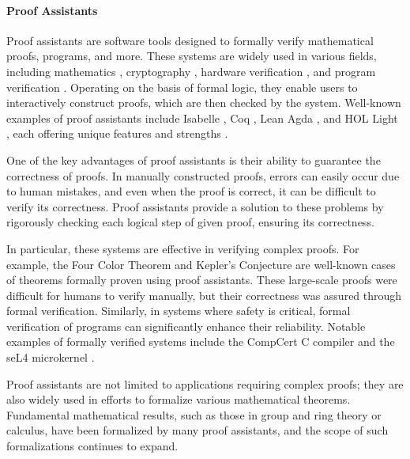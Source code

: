 \documentclass{report}
\begin{document}
\paragraph{Proof Assistants}
 
Proof assistants are software tools designed to formally verify mathematical proofs, programs, and more. 
These systems are widely used in various fields, including mathematics \cite{four_color,kepler}, cryptography \cite{EasyCrypt_AWS,EasyCrypt_zero_knowledge}, 
hardware verification \cite{Coq_hardware_verification,Coq_hardware_verification_2},
and program verification \cite{survey_proof_assistants_program_verification}. 
Operating on the basis of formal logic, they enable users to interactively construct proofs, which are then checked by the system.
Well-known examples of proof assistants include Isabelle \cite{isabelle_toppage}, Coq \cite{coq_toppage}, Lean \cite{lean_toppage} Agda \cite{agda_toppage}, and HOL Light \cite{hol_light_toppage},
each offering unique features and strengths \cite{survey_theorem_provers}.

One of the key advantages of proof assistants is their ability to guarantee the correctness of proofs. 
In manually constructed proofs, errors can easily occur due to human mistakes, 
and even when the proof is correct, it can be difficult to verify its correctness.
Proof assistants provide a solution to these problems by rigorously checking each logical step of given proof,
ensuring its correctness.

In particular, these systems are effective in verifying complex proofs.
For example, the Four Color Theorem \cite{four_color} and Kepler's Conjecture \cite{kepler} are well-known cases of theorems formally proven using proof assistants. 
These large-scale proofs were difficult for humans to verify manually, but their correctness was assured through formal verification.
Similarly, in systems where safety is critical, formal verification of programs can significantly enhance their reliability. 
Notable examples of formally verified systems include the CompCert C compiler \cite{compcert} and the seL4 microkernel \cite{seL4}.

Proof assistants are not limited to applications requiring complex proofs; 
they are also widely used in efforts to formalize various mathematical theorems. 
Fundamental mathematical results, such as those in group and ring theory or calculus, 
have been formalized by many proof assistants, and the scope of such formalizations continues to expand.
\end{document}
